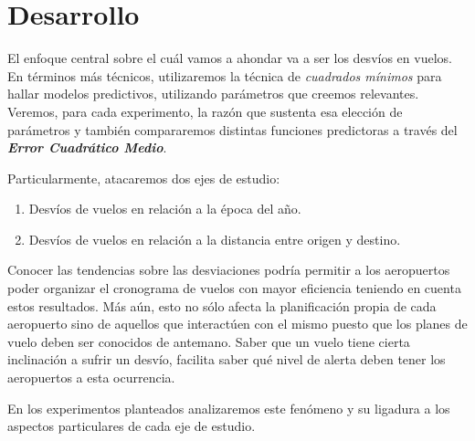 \section{Desarrollo}

El enfoque central sobre el cu\'al vamos a ahondar va a ser los desv\'ios en vuelos. En t\'erminos m\'as t\'ecnicos, utilizaremos la t\'ecnica de \textit{cuadrados m\'inimos} para hallar modelos predictivos, utilizando par\'ametros que creemos relevantes. Veremos, para cada experimento, la raz\'on que sustenta esa elecci\'on de par\'ametros y tambi\'en compararemos distintas funciones predictoras a trav\'es del \textbf{\textit{Error Cuadr\'atico Medio}}.

Particularmente, atacaremos dos ejes de estudio:

\begin{enumerate}
\item Desv\'ios de vuelos en relaci\'on a la \'epoca del a\~no.
\item Desv\'ios de vuelos en relaci\'on a la distancia entre origen y destino.
\end{enumerate}

Conocer las tendencias sobre las desviaciones podr\'ia permitir a los aeropuertos poder organizar el cronograma de vuelos con mayor eficiencia teniendo en cuenta estos resultados. M\'as a\'un, esto no s\'olo afecta la planificaci\'on propia de cada aeropuerto sino de aquellos que interact\'uen con el mismo puesto que los planes de vuelo deben ser conocidos de antemano. Saber que un vuelo tiene cierta inclinaci\'on a sufrir un desv\'io, facilita saber qu\'e nivel de alerta deben tener los aeropuertos a esta ocurrencia.

En los experimentos planteados analizaremos este fen\'omeno y su ligadura a los aspectos particulares de cada eje de estudio.